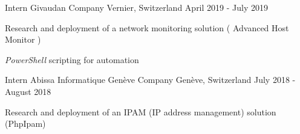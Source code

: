 \begin{cventries}
	\cventry
	{Intern} %
	{Givaudan Company} %
	{Vernier, Switzerland} %
	{April 2019 - July 2019} %
	{
		\begin{cvitems} %
		\item {Research and deployment of a network monitoring solution ( Advanced Host Monitor )}
		\item {\emph{PowerShell} scripting for automation}
		\end{cvitems}
	}

	\cventry
	{Intern} %
	{Abissa Informatique Genève Company} %
	{Genève, Switzerland} %
	{July 2018 - August 2018} %
	{
		\begin{cvitems} %
		\item {Research and deployment of an IPAM (IP address management) solution (PhpIpam)}
		\end{cvitems}
	}
\end{cventries}
